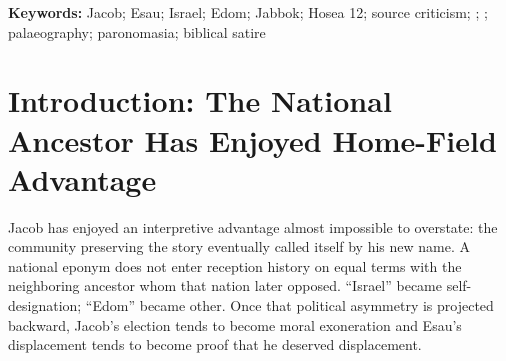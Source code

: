 \begin{abstract}
Modern interpretation has tended to grant Jacob the moral prestige of the nation later named for him and to read Esau retrospectively through Israel--Edom hostility. This article argues that such reception reverses much of the literary evidence. In Genesis 25--33, Jacob bargains opportunistically for his exhausted brother's birthright, lies repeatedly to his father, impersonates Esau, takes the blessing intended for him, flees the consequences, and approaches the reunion convinced that the brother he wronged will behave as Jacob himself has behaved. Esau, when finally permitted to act, does the opposite: he runs to Jacob, embraces and kisses him, weeps with him, initially refuses compensation, calls him ``my brother,'' and offers assistance. The Jabbok scene is read here not as uncomplicated heroic praise of Jacob but as a veiled trial and humiliation of the national ancestor. Jacob must answer the identity question he once answered falsely, is renamed amid a conspicuous sequence of  and , leaves injured, bows seven times before Esau, identifies Esau's face with the face of God, and finally commands the brother from whom he took the blessing, ``Please, take my blessing.'' Hosea 12 independently reads Jacob as an indictment of Israel and adds that the wrestler wept and supplicated. I argue that these features are best read as deliberate insider criticism: Israel's authors could praise their eponymous ancestor on the surface while allowing the narrative beneath that praise to vindicate Esau and expose Jacob. A final, more conjectural section considers graphic paronomasia between unpointed , , and  within the mixed Hebrew--Aramaic--Edomite scribal ecology of the Iron Age. The thesis is unapologetically tendentious: later readers have defended the wrong brother.
\end{abstract}

\noindent\textbf{Keywords:} Jacob; Esau; Israel; Edom; Jabbok; Hosea 12; source criticism; ; ; palaeography; paronomasia; biblical satire

\section{Introduction: The National Ancestor Has Enjoyed Home-Field Advantage}

Jacob has enjoyed an interpretive advantage almost impossible to overstate: the community preserving the story eventually called itself by his new name. A national eponym does not enter reception history on equal terms with the neighboring ancestor whom that nation later opposed. ``Israel'' became self-designation; ``Edom'' became other. Once that political asymmetry is projected backward, Jacob's election tends to become moral exoneration and Esau's displacement tends to become proof that he deserved displacement.

